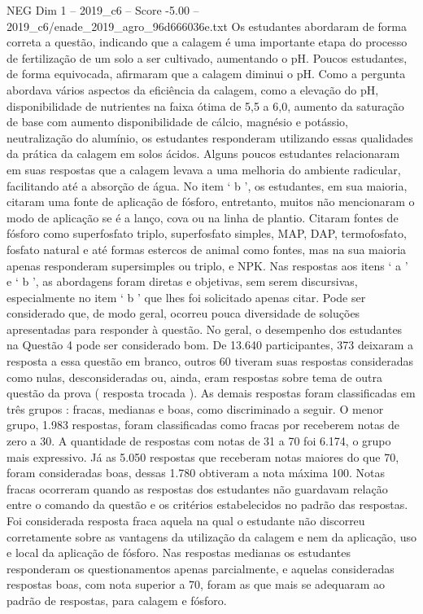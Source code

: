 \begin{textsample}{NEG Dim 1 – 2019\_c6 – Score -5.00 – 2019\_c6/enade\_2019\_agro\_96d666036e.txt}
Os estudantes abordaram de forma correta a questão, indicando que a calagem é uma importante etapa do processo de fertilização de um solo a ser cultivado, aumentando o pH.
Poucos estudantes, de forma equivocada, afirmaram que a calagem diminui o pH.
Como a pergunta abordava vários aspectos da eficiência da calagem, como a elevação do pH, disponibilidade de nutrientes na faixa ótima de 5,5 a 6,0, aumento da saturação de base com aumento disponibilidade de cálcio, magnésio e potássio, neutralização do alumínio, os estudantes responderam utilizando essas qualidades da prática da calagem em solos ácidos.
Alguns poucos estudantes relacionaram em suas respostas que a calagem levava a uma melhoria do ambiente radicular, facilitando até a absorção de água.
No item ‘ b ’, os estudantes, em sua maioria, citaram uma fonte de aplicação de fósforo, entretanto, muitos não mencionaram o modo de aplicação se é a lanço, cova ou na linha de plantio.
Citaram fontes de fósforo como superfosfato triplo, superfosfato simples, MAP, DAP, termofosfato, fosfato natural e até formas estercos de animal como fontes, mas na sua maioria apenas responderam supersimples ou triplo, e NPK.
Nas respostas aos itens ‘ a ’ e ‘ b ’, as abordagens foram diretas e objetivas, sem serem discursivas, especialmente no item ‘ b ’ que lhes foi solicitado apenas citar.
Pode ser considerado que, de modo geral, ocorreu pouca diversidade de soluções apresentadas para responder à questão.
No geral, o desempenho dos estudantes na Questão 4 pode ser considerado bom.
De 13.640 participantes, 373 deixaram a resposta a essa questão em branco, outros 60 tiveram suas respostas consideradas como nulas, desconsideradas ou, ainda, eram respostas sobre tema de outra questão da prova ( resposta trocada ).
As demais respostas foram classificadas em três grupos : fracas, medianas e boas, como discriminado a seguir.
O menor grupo, 1.983 respostas, foram classificadas como fracas por receberem notas de zero a 30.
A quantidade de respostas com notas de 31 a 70 foi 6.174, o grupo mais expressivo.
Já as 5.050 respostas que receberam notas maiores do que 70, foram consideradas boas, dessas 1.780 obtiveram a nota máxima 100.
Notas fracas ocorreram quando as respostas dos estudantes não guardavam relação entre o comando da questão e os critérios estabelecidos no padrão das respostas.
Foi considerada resposta fraca aquela na qual o estudante não discorreu corretamente sobre as vantagens da utilização da calagem e nem da aplicação, uso e local da aplicação de fósforo.
Nas respostas medianas os estudantes responderam os questionamentos apenas parcialmente, e aquelas consideradas respostas boas, com nota superior a 70, foram as que mais se adequaram ao padrão de respostas, para calagem e fósforo.

\end{textsample}
